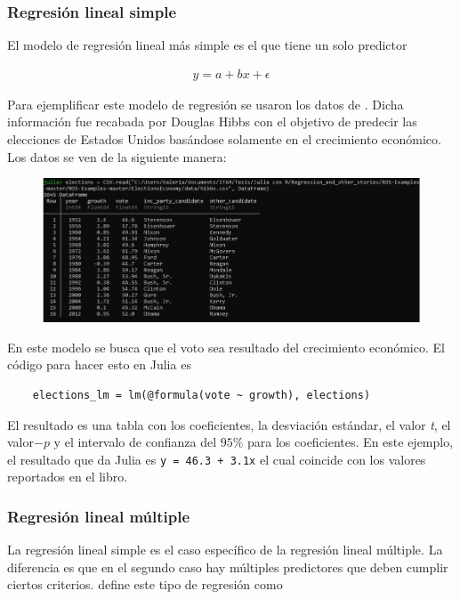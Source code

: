 \subsubsection{Regresión lineal simple}
El modelo de regresión lineal más simple es el que tiene un solo predictor

\begin{equation*}
    \begin{aligned}
    y = a + bx + \epsilon
    \end{aligned}
\end{equation*}

Para ejemplificar este modelo de regresión se usaron los datos de \cite{regression_other_stories}. Dicha información fue recabada por Douglas Hibbs con el objetivo de predecir las elecciones de Estados Unidos basándose solamente en el crecimiento económico. Los datos se ven de la siguiente manera: 

\begin{figure}[H]
\begin{center}
\includegraphics[scale=0.5]{Imagenes/elections_dataframe.JPG}
  \label{elections_dataframe}
\end{center}
\end{figure}

En este modelo se busca que el voto sea resultado del crecimiento económico. El código para hacer esto en \textsf{Julia} es

\begin{verbatim}
	elections_lm = lm(@formula(vote ~ growth), elections)
\end{verbatim}

El resultado es una tabla con los coeficientes, la desviación estándar, el valor \textit{t}, el valor$-p$ y el intervalo de confianza del $95 \% $ para los coeficientes. En este ejemplo, el resultado que da \textsf{Julia} es \texttt{y = 46.3 + 3.1x} el cual coincide con los valores reportados en el libro.

\subsubsection{Regresión lineal múltiple}
La regresión lineal simple es el caso específico de la regresión lineal múltiple. La diferencia es que en el segundo caso hay múltiples predictores que deben cumplir ciertos criterios. \cite{regression_other_stories} define este tipo de regresión como 

